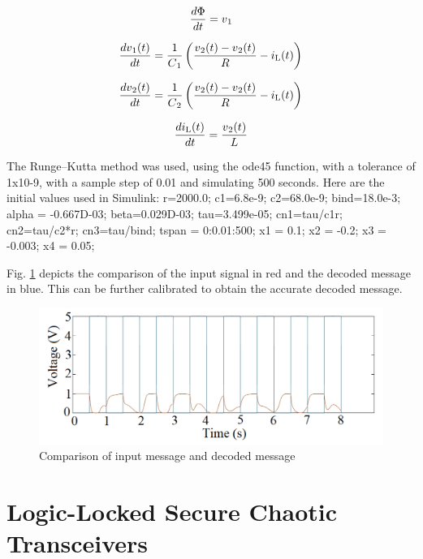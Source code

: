 \begin{equation}
\frac{d\Phi}{dt} = v\textsubscript{1}
\end{equation}

\begin{equation}
\frac{dv\textsubscript{1}(t)}{dt} = \frac{1}{C\textsubscript{1}} \left( \frac{v\textsubscript{2}(t) - v\textsubscript{2}(t)} {R} - i\textsubscript{L}(t) \right)
\end{equation}

\begin{equation}
\frac{dv\textsubscript{2}(t)}{dt} = \frac{1}{C\textsubscript{2}} \left( \frac{v\textsubscript{2}(t) - v\textsubscript{2}(t)} {R} - i\textsubscript{L}(t) \right)
\end{equation}

\begin{equation}
\frac{di\textsubscript{L}(t)}{dt} = \frac{v\textsubscript{2}(t)}{L} 
\end{equation}

The Runge–Kutta method was used, using the ode45 function, with a tolerance of 1x10-9, with a sample step of 0.01 and simulating 500 seconds. Here are the initial values used in Simulink: 
r=2000.0; 
c1=6.8e-9;	
c2=68.0e-9;	
bind=18.0e-3;
alpha = -0.667D-03;
beta=0.029D-03; 
tau=3.499e-05;
cn1=tau/c1r;
cn2=tau/c2*r; 
cn3=tau/bind;
tspan = 0:0.01:500;
x1 = 0.1; 
x2 = -0.2; 
x3 = -0.003;
x4 = 0.05;

Fig. \ref{fig:6} depicts the comparison of the input signal in red and the decoded message in blue. This can be further calibrated to obtain the accurate decoded message.  

\begin{figure}[!b]
    \centering
    \includegraphics[width = 0.8\linewidth]{figs/Fig9syncronization.PNG}
    \caption{Comparison of input message and decoded message}
    \label{fig:6}
\end{figure}

\section*{Logic-Locked Secure Chaotic Transceivers}



